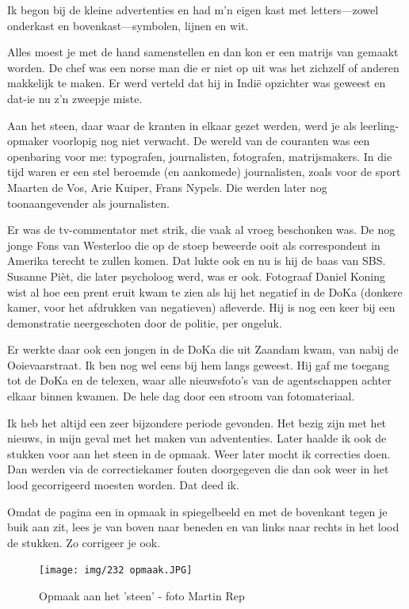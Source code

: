 \documentclass[10pt,twoside, openright]{memoir}
\begin{document}
Ik begon bij de kleine advertenties en had m'n eigen kast met letters---zowel onderkast en bovenkast---symbolen, lijnen en wit.

Alles moest je met de hand samenstellen en dan kon er een matrijs van gemaakt worden. De chef was een norse man die er niet op uit was het zichzelf of anderen makkelijk te maken. Er werd verteld dat hij in Indië opzichter was geweest en dat-ie nu z'n zweepje miste.

Aan het steen, daar waar de kranten in elkaar gezet werden, werd je als leerling-opmaker voorlopig nog niet verwacht. De wereld van de couranten was een openbaring voor me: typografen, journalisten, fotografen, matrijsmakers. In die tijd waren er een stel beroemde (en aankomede) journalisten, zoals voor de sport Maarten de Vos, Arie Kuiper, Frans Nypels. Die werden later nog toonaangevender als journalisten. 

Er was de tv-commentator met strik, die vaak al vroeg beschonken was. De nog jonge Fons van Westerloo die op de stoep beweerde ooit als correspondent in Amerika terecht te zullen komen. Dat lukte ook en nu is hij de baas van SBS. Susanne Pièt, die later psycholoog werd, was er ook. Fotograaf Daniel Koning wist al hoe een prent eruit kwam te zien als hij het negatief in de DoKa (donkere kamer, voor het afdrukken van negatieven) afleverde. Hij is nog een keer bij een demonstratie neergeschoten door de politie, per ongeluk. 

Er werkte daar ook een jongen in de DoKa die uit Zaandam kwam,  van nabij de Ooievaarstraat. Ik ben nog wel eens bij hem langs geweest. Hij gaf me toegang tot de DoKa en de telexen, waar alle nieuwsfoto’s van de agentschappen achter elkaar binnen kwamen. De hele dag door een stroom van fotomateriaal. 

Ik heb het altijd een zeer bijzondere periode gevonden. Het bezig zijn met het nieuws, in mijn geval met het maken van advententies. Later haalde ik ook de stukken voor aan het steen in de opmaak. Weer later mocht ik correcties doen. Dan werden via de correctiekamer fouten doorgegeven die dan ook weer in het lood gecorrigeerd moesten worden. Dat deed ik. 

Omdat de pagina een in opmaak in spiegelbeeld en met de bovenkant tegen je buik aan zit, lees je van boven naar beneden en van links naar rechts in het lood de stukken. Zo corrigeer je ook. 

\begin{figure}
\texttt{[image: img/232 opmaak.JPG]}
\caption*{\footnotesize Opmaak aan het 'steen' - foto Martin Rep}
\end{figure}
\end{document}
